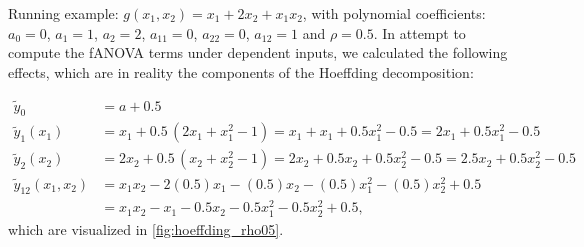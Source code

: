 Running example: $g(x_1, x_2) = x_1 + 2 x_2 + x_1 x_2$, with polynomial coefficients: $a_0 = 0$, $a_1 = 1$, $a_2 = 2$, $a_{11} = 0$, $a_{22} = 0$, $a_{12} = 1$ and $\rho = 0.5$.
In attempt to compute the fANOVA terms under dependent inputs, we calculated the following effects, which are in reality the components of the Hoeffding decomposition:

\begin{align*}
\tilde{y}_0 &= a + 0.5 \\[3pt]
\tilde{y}_1(x_1) &= x_1 + 0.5\,(2x_1 + x_1^2 - 1)
= x_1 + x_1 + 0.5x_1^2 - 0.5
= 2x_1 + 0.5x_1^2 - 0.5 \\[3pt]
\tilde{y}_2(x_2) &= 2x_2 + 0.5\,(x_2 + x_2^2 - 1)
= 2x_2 + 0.5x_2 + 0.5x_2^2 - 0.5
= 2.5x_2 + 0.5x_2^2 - 0.5 \\[3pt]
\tilde{y}_{12}(x_1,x_2) &= x_1x_2 - 2(0.5)x_1 - (0.5)x_2 - (0.5)x_1^2 - (0.5)x_2^2 + 0.5 \\[3pt]
&= x_1x_2 - x_1 - 0.5x_2 - 0.5x_1^2 - 0.5x_2^2 + 0.5,
\end{align*}
which are visualized in \autoref{fig:hoeffding_rho05}.

